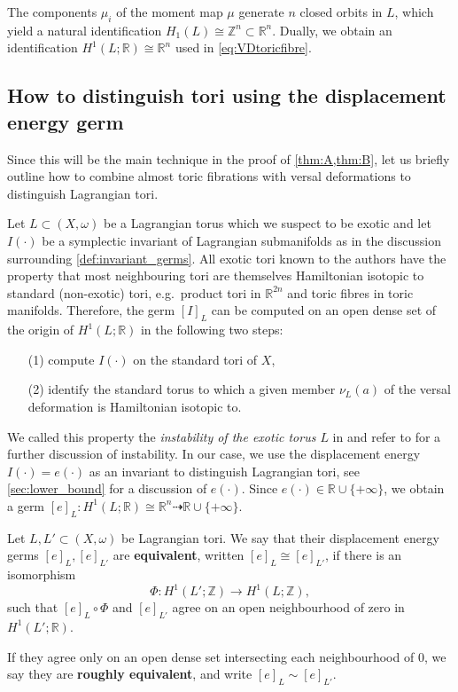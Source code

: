 \documentclass[12pt,a4paper,abstract=true,final]{scrartcl}
\begin{document}
The components $\mu_i$ of the moment map $\mu$ generate $n$ closed orbits in $L$, which yield a natural identification $H_1(L) \cong \mathbb{Z}^n \subset \mathbb{R}^n$.
Dually, we obtain an identification $H^1(L;\mathbb{R}) \cong \mathbb{R}^n$ used in \eqref{eq:VDtoricfibre}.

\subsection{How to distinguish tori using the displacement energy germ}
\label{sec:howto_exotic}

Since this will be the main technique in the proof of \cref{thm:A,thm:B}, let us briefly outline how to combine almost toric fibrations with versal deformations to distinguish Lagrangian tori. 

Let $L \subset (X,\omega)$ be a Lagrangian torus which we suspect to be exotic and let $I(\cdot)$ be a symplectic invariant of Lagrangian submanifolds as in the discussion surrounding \cref{def:invariant_germs}.
All exotic tori known to the authors have the property that most neighbouring tori are themselves Hamiltonian isotopic to standard (non-exotic) tori, e.g.\ product tori in $\mathbb{R}^{2n}$ and toric fibres in toric manifolds.
Therefore, the germ $[I]_L$ can be computed on an open dense set of the origin of $H^1(L;\mathbb{R})$ in the following two steps: 
\begin{enumerate}
    \item[(1)] compute $I(\cdot)$ on the standard tori of $X$, 
    \item[(2)] identify the standard torus to which a given member $\nu_L(a)$ of the versal deformation is Hamiltonian isotopic to. 
\end{enumerate}
We called this property the \textit{instability of the exotic torus $L$} in \cite{brendel2023local} and refer to \cite[Sections 1.6, 5.1]{brendel2023local} for a further discussion of instability.
In our case, we use the displacement energy $I(\cdot) = e(\cdot)$ as an invariant to distinguish Lagrangian tori, see \cref{sec:lower_bound} for a discussion of $e(\cdot)$.
Since $e(\cdot) \in \mathbb{R} \cup \{+\infty\}$, we obtain a germ $[e]_L \colon H^1(L;\mathbb{R}) \cong \mathbb{R}^n \dashrightarrow \mathbb{R} \cup \{+\infty\}$. 

\begin{definition}
    \label{def:deg_equiv}
    Let $L,L' \subset (X,\omega)$ be Lagrangian tori.
We say that their displacement energy germs $[e]_L,[e]_{L'}$ are \textbf{equivalent}, written $[e]_L \cong [e]_{L'}$, if there is an isomorphism 
    \begin{equation}
        \label{eq:phi_isomorphism}
        Φ \colon H^1(L';\mathbb{Z}) \rightarrow H^1(L;\mathbb{Z}),
    \end{equation}
    such that $[e]_L \circ Φ$ and $[e]_{L'}$ agree on an open neighbourhood of zero in $H^1(L';\mathbb{R})$.
    
    If they agree only on an open dense set intersecting each neighbourhood of $0$, we say they are \textbf{roughly equivalent}, and write $[e]_L \sim [e]_{L'}$.
\end{definition}
\end{document}
